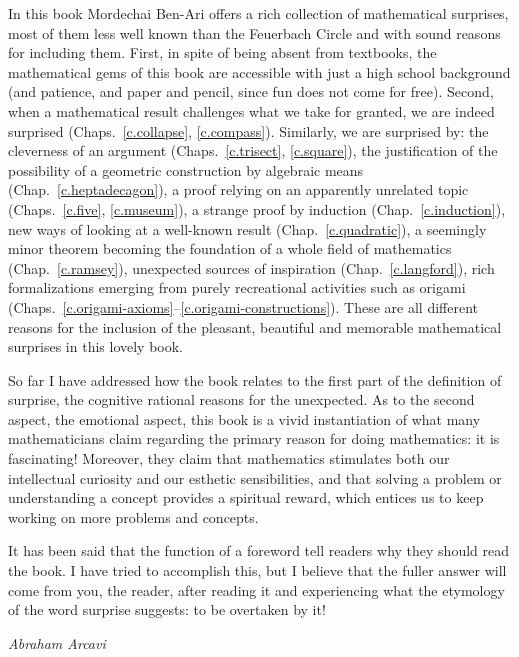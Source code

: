 In this book Mordechai Ben-Ari offers a rich collection of mathematical surprises, most of them less well known than the Feuerbach Circle and with sound reasons for including them. First, in spite of being absent from textbooks, the mathematical gems of this book are accessible with just a high school background (and patience, and paper and pencil, since fun does not come for free). Second, when a mathematical result challenges what we take for granted, we are indeed surprised (Chaps.~\ref{c.collapse}, \ref{c.compass}). Similarly, we are surprised by: the cleverness of an argument (Chaps.~\ref{c.trisect}, \ref{c.square}), the justification of the possibility of a geometric construction by algebraic means (Chap.~\ref{c.heptadecagon}), a proof relying on an apparently unrelated topic (Chaps.~\ref{c.five}, \ref{c.museum}), a strange proof by induction (Chap.~\ref{c.induction}), new ways of looking at a well-known result (Chap.~\ref{c.quadratic}), a seemingly minor theorem becoming the foundation of a whole field of mathematics (Chap.~\ref{c.ramsey}), unexpected sources of inspiration (Chap.~\ref{c.langford}), rich formalizations emerging from purely recreational activities such as origami (Chaps.~\ref{c.origami-axioms}--\ref{c.origami-constructions}). These are all different reasons for the inclusion of the pleasant, beautiful and memorable mathematical surprises in this lovely book.
   
So far I have addressed how the book relates to the first part of the definition of surprise, the cognitive rational reasons for the unexpected. As to the second aspect, the emotional aspect, this book is a vivid instantiation of what many mathematicians claim regarding the primary reason for doing mathematics: it is fascinating! Moreover, they claim that mathematics stimulates both our intellectual curiosity and our esthetic sensibilities, and that solving a problem or understanding a concept provides a spiritual reward, which entices us to keep working on more problems and concepts. 

It has been said that the function of a foreword tell readers why they should read the book. I have tried to accomplish this, but I believe that the fuller answer will come from you, the reader, after reading it and experiencing what the etymology of the word surprise suggests: to be overtaken by it!



\vspace{\baselineskip}
\begin{flushright}
\textit{Abraham Arcavi}
\end{flushright}



